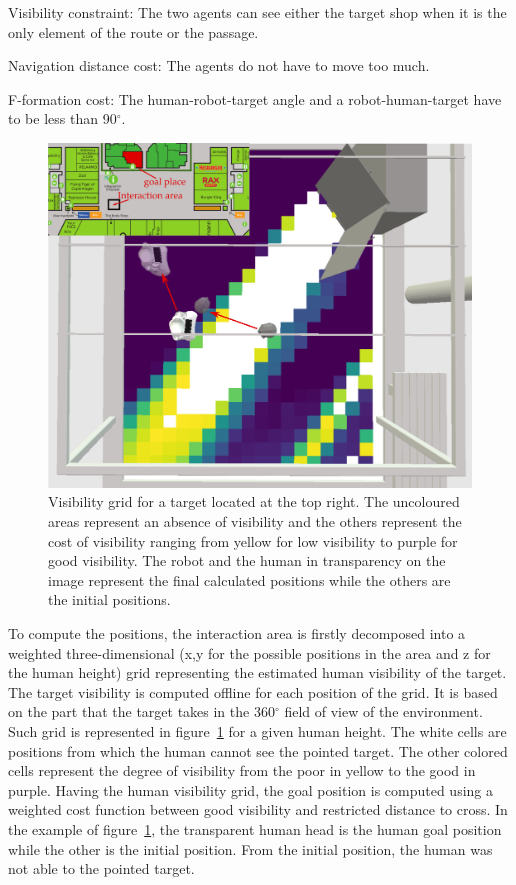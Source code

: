 \documentclass[a4paper,11pt,twoside]{StyleThese}
\begin{document}
\begin{bulletList}
	\item Visibility constraint: The two agents can see either the target shop when it is the only element of the route or the passage.
	\item Navigation distance cost: The agents do not have to move too much.
	\item F-formation cost: The human-robot-target angle and a robot-human-target have to be less than 90${^\circ}$. 
\end{bulletList}

\begin{figure}[ht!]
	\centering
	\includegraphics[scale=0.3]{figures/chapter3/grid_map.png}
	\caption{\label{fig:chap3_svp_grid} Visibility grid for a target located at the top right. The uncoloured areas represent an absence of visibility and the others represent the cost of visibility ranging from yellow for low visibility to purple for good visibility. The robot and the human in transparency on the image represent the final calculated positions while the others are the initial positions. }
\end{figure}

To compute the positions, the interaction area is firstly decomposed into a weighted three-dimensional (x,y for the possible positions in the area and z for the human height) grid representing the estimated human visibility of the target. The target visibility is computed offline for each position of the grid. It is based on the part that the target takes in the 360${^\circ}$ field of view of the environment. Such grid is represented in figure~\ref{fig:chap3_svp_grid} for a given human height. The white cells are positions from which the human cannot see the pointed target. The other colored cells represent the degree of visibility from the poor in yellow to the good in purple. Having the human visibility grid, the goal position is computed using a weighted cost function between good visibility and restricted distance to cross. In the example of figure~\ref{fig:chap3_svp_grid}, the transparent human head is the human goal position while the other is the initial position. From the initial position, the human was not able to the pointed target. 
\end{document}
